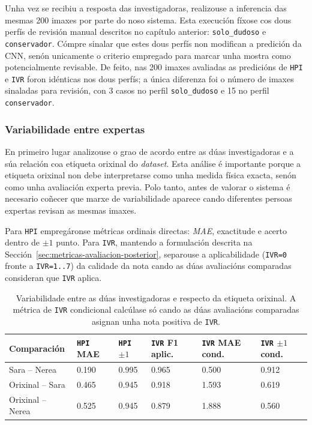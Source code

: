 Unha vez se recibiu a resposta das investigadoras, realizouse a inferencia das mesmas 200 imaxes por
parte do noso sistema. Esta execución fíxose cos dous perfís de revisión manual descritos no
capítulo anterior: \texttt{solo\_dudoso} e \texttt{conservador}. Cómpre sinalar que estes dous
perfís non modifican a predición da CNN, senón unicamente o criterio empregado para marcar unha
mostra como potencialmente revisable. De feito, nas 200 imaxes avaliadas as predicións de
\texttt{HPI} e \texttt{IVR} foron idénticas nos dous perfís; a única diferenza foi o número de
imaxes sinaladas para revisión, con 3 casos no perfil \texttt{solo\_dudoso} e 15 no perfil
\texttt{conservador}.

\subsubsection{Variabilidade entre expertas}
En primeiro lugar analizouse o grao de acordo entre as dúas investigadoras e a súa relación coa
etiqueta orixinal do \textit{dataset}. Esta análise é importante porque a etiqueta orixinal non debe
interpretarse como unha medida física exacta, senón como unha avaliación experta previa. Polo tanto,
antes de valorar o sistema é necesario coñecer que marxe de variabilidade aparece cando diferentes
persoas expertas revisan as mesmas imaxes.

Para \texttt{HPI} empregáronse métricas ordinais directas: \textit{MAE}, exactitude e acerto dentro
de $\pm 1$ punto. Para \texttt{IVR}, mantendo a formulación
descrita na Sección~\ref{sec:metricas-avaliacion-posterior}, separouse a aplicabilidade
(\texttt{IVR=0} fronte a \texttt{IVR=1..7}) da calidade da nota cando as dúas avaliacións
comparadas consideran que \texttt{IVR} aplica.

{
\begin{table}[htbp]
    \centering
    \scriptsize
    \setlength{\tabcolsep}{3pt}
    \begin{tabular}{p{}|p{}|p{}|p{}|p{}|p{}}
        \rowcolor{udcpink!25}
        \textbf{Comparación} & \textbf{\texttt{HPI} MAE} & \textbf{\texttt{HPI} $\pm 1$} &  \textbf{\texttt{IVR} F1 aplic.} & \textbf{\texttt{IVR} MAE cond.} & \textbf{\texttt{IVR} $\pm 1$ cond.} \\\hline
        Sara -- Nerea & 0.190 & 0.995  & 0.965 & 0.500 & 0.912 \\
        Orixinal -- Sara & 0.465 & 0.945  & 0.918 & 1.593 & 0.619 \\
        Orixinal -- Nerea & 0.525 & 0.945  & 0.879 & 1.888 & 0.560 \\
    \end{tabular}
    \caption{Variabilidade entre as dúas investigadoras e respecto da etiqueta orixinal. A métrica de \texttt{IVR} condicional calcúlase só cando as dúas avaliacións comparadas asignan unha nota positiva de \texttt{IVR}.}
    \label{tab:peer-review-expertas}
\end{table}
}

